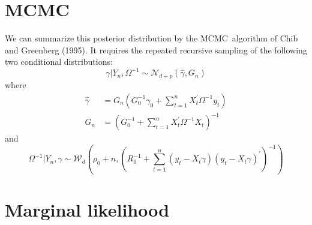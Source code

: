 \documentclass[12pt]{article}
\begin{document}
\section{MCMC}

We can summarize this posterior distribution by the MCMC\ algorithm of Chib
and Greenberg (1995). It requires the repeated recursive sampling of the
following two conditional distributions:%
\begin{equation*}
\gamma |Y_{n},\Omega ^{-1}\sim \mathcal{N}_{d+p}\left( \hat{\gamma}%
,G_{n}\right)
\end{equation*}%
where
\begin{align*}
\hat{\gamma}& =G_{n}\left( G_{0}^{-1}\gamma _{0}+\sum_{t=1}^{n}X_{t}^{\prime
}\Omega ^{-1}y_{t}\right) \\
G_{n}& =\left( G_{0}^{-1}+\sum_{t=1}^{n}X_{t}^{\prime }\Omega
^{-1}X_{t}\right) ^{-1}
\end{align*}%
and
\begin{equation*}
\Omega ^{-1}|Y_{n},\gamma \sim \mathcal{W}_{d}\left( \rho _{0}+n,\left(
R_{0}^{-1}+\sum_{t=1}^{n}\left( y_{t}-X_{t}\gamma \right) \left(
y_{t}-X_{t}\gamma \right) ^{\prime }\right) ^{-1}\right)
\end{equation*}

\section{Marginal likelihood}
\end{document}
